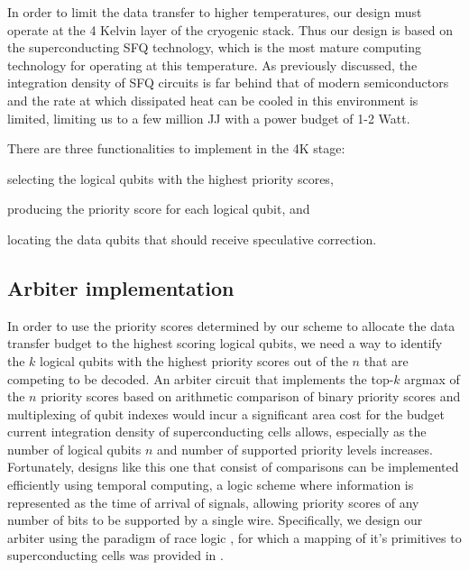 \documentclass[conference]{IEEEtran}
\begin{document}
In order to limit the data transfer to higher temperatures, our design must operate at the 4 Kelvin layer of the cryogenic stack.
Thus our design is based on the superconducting SFQ technology, which is the most mature computing technology for operating at this temperature.
As previously discussed, the integration density of SFQ circuits is far behind that of modern semiconductors and the rate at which dissipated heat can be cooled in this environment is limited, limiting us to a few million JJ with a power budget of 1-2 Watt.

There are three functionalities to implement in the 4K stage: 
\begin{enumerate*}[label=\emph{\alph*})]
  \item selecting the logical qubits with the highest priority scores,
  \item producing the priority score for each logical qubit, and
  \item locating the data qubits that should receive speculative correction.
\end{enumerate*}

\subsection{Arbiter implementation}

In order to use the priority scores determined by our scheme to allocate the data transfer budget to the highest scoring logical qubits, we need a way to identify the $k$ logical qubits with the highest priority scores out of the $n$ that are competing to be decoded.
An arbiter circuit that implements the top-$k$ argmax of the $n$ priority scores based on arithmetic comparison of binary priority scores and multiplexing of qubit indexes would incur a significant area cost for the budget current integration density of superconducting cells allows, especially as the number of logical qubits $n$ and number of supported priority levels increases.
Fortunately, designs like this one that consist of comparisons can be implemented efficiently using temporal computing, a logic scheme where information is represented as the time of arrival of signals, allowing priority scores of any number of bits to be supported by a single wire. 
Specifically, we design our arbiter using the paradigm of race logic \cite{racelogic}, for which a mapping of it's primitives to superconducting cells was provided in \cite{sfq_race}.
\end{document}
